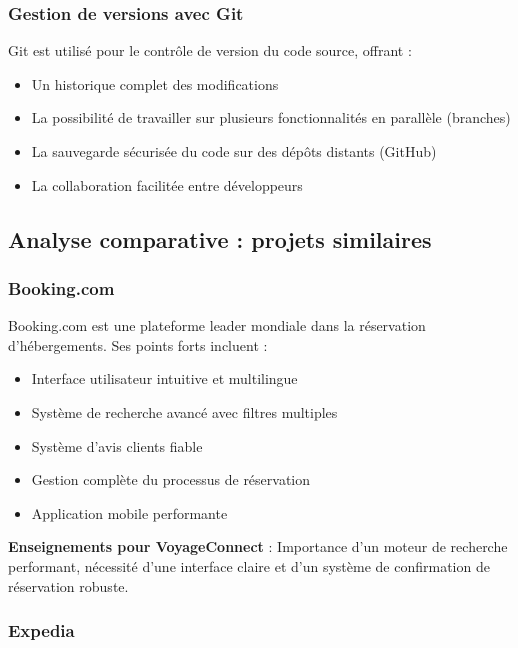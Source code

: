 \documentclass[12pt,a4paper]{report}
\begin{document}
\subsubsection{Gestion de versions avec Git}

Git est utilisé pour le contrôle de version du code source, offrant :

\begin{itemize}
    \item Un historique complet des modifications
    \item La possibilité de travailler sur plusieurs fonctionnalités en parallèle (branches)
    \item La sauvegarde sécurisée du code sur des dépôts distants (GitHub)
    \item La collaboration facilitée entre développeurs
\end{itemize}

\subsection{Analyse comparative : projets similaires}

\subsubsection{Booking.com}

Booking.com est une plateforme leader mondiale dans la réservation d'hébergements. Ses points forts incluent :

\begin{itemize}
    \item Interface utilisateur intuitive et multilingue
    \item Système de recherche avancé avec filtres multiples
    \item Système d'avis clients fiable
    \item Gestion complète du processus de réservation
    \item Application mobile performante
\end{itemize}

\textbf{Enseignements pour VoyageConnect} : Importance d'un moteur de recherche performant, nécessité d'une interface claire et d'un système de confirmation de réservation robuste.

\subsubsection{Expedia}
\end{document}
